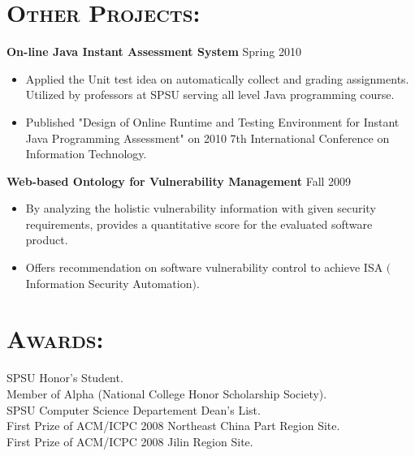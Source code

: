 \begin{resume}
\section{\textsc{Other Projects:}}
\textbf{\newline On-line Java Instant Assessment System} \hfill Spring 2010
\begin{itemize}
	\item Applied the Unit test idea on automatically collect and grading assignments. Utilized by professors at SPSU serving all level Java programming course.
	\item Published "Design of Online Runtime and Testing Environment for Instant Java Programming Assessment" on 2010 7th International Conference on Information Technology.
\end{itemize}

\textbf{Web-based Ontology for Vulnerability Management} \hfill Fall 2009
\begin{itemize}
	\item By analyzing the holistic vulnerability information with given security requirements, 
provides a quantitative score for the evaluated software product.
	\item Offers recommendation on software vulnerability control to achieve ISA $($Information
Security Automation$)$.
\end{itemize}



\section{\textsc{Awards:}} 
\textbf{\newline}
SPSU Honor’s Student. \\
Member of Alpha (National College Honor Scholarship Society).  \\
SPSU Computer Science Departement Dean's List.\\
First Prize of ACM/ICPC 2008 Northeast China Part Region Site.	\\
First Prize of ACM/ICPC 2008 Jilin Region Site. 





\end{resume}

